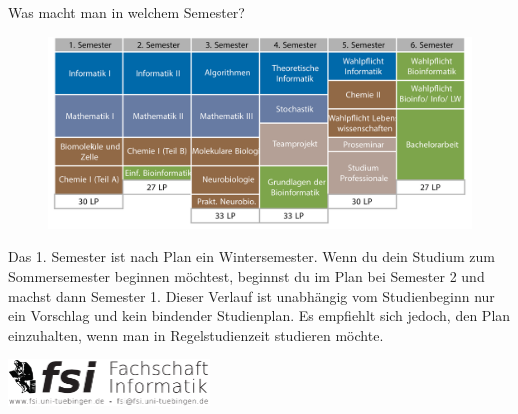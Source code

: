 		\begin{block}{Was macht man in welchem Semester?}
			\begin{figure}[h!]
					\includegraphics[width=\textwidth]{charts/bioinformatik-Studienplan_abWS18.pdf}
			\end{figure}
		Das 1. Semester ist nach Plan ein Wintersemester. Wenn du dein Studium zum Sommersemester beginnen möchtest, beginnst du im Plan bei Semester 2 und machst dann Semester 1. 
		Dieser Verlauf ist unabhängig vom Studienbeginn nur ein Vorschlag und kein bindender Studienplan. Es empfiehlt sich jedoch, den Plan einzuhalten, wenn man in Regelstudienzeit studieren möchte.
		\end{block}
	\vfill
	\begin{flushright}
		\includegraphics[width=0.4\textwidth]{fsilogo.pdf}
	\end{flushright}